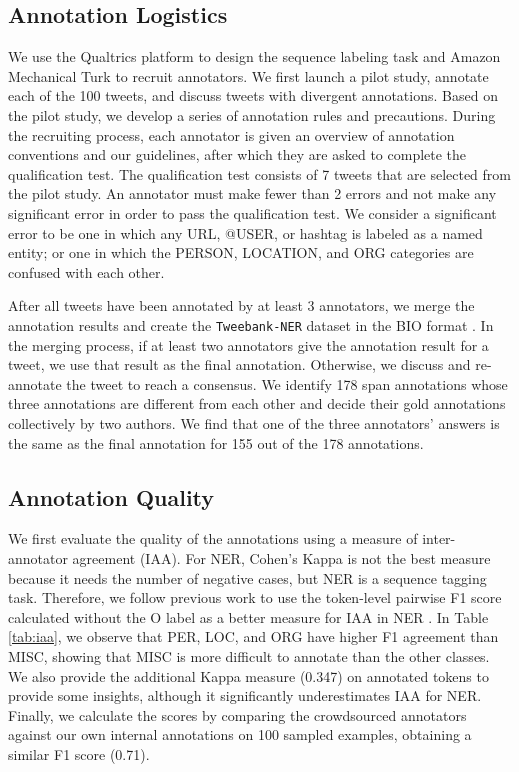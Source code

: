 \documentclass[10pt, a4paper]{article}
\begin{document}
\subsection{Annotation Logistics}
We use the Qualtrics platform to design the sequence labeling task and Amazon Mechanical Turk to recruit annotators. We first launch a pilot study, annotate each of the 100 tweets, and discuss tweets with divergent annotations. Based on the pilot study, we develop a series of annotation rules and precautions. During the recruiting process, each annotator is given an overview of annotation conventions and our guidelines, after which they are asked to complete the qualification test. The qualification test consists of 7 tweets that are selected from the pilot study. 
An annotator must make fewer than 2 errors and not make any significant error in order to pass the qualification test.  We consider a significant error to be one
in which any URL, @USER, or hashtag is labeled as a named entity;  or one in which the PERSON, LOCATION, and ORG categories are confused with each other.


After all tweets have been annotated by at least 3 annotators, we merge the annotation results and create the \texttt{Tweebank-NER} dataset in the BIO format \cite{ratinov2009design}. In the merging process, if at least two annotators give the annotation result for a tweet, we use that result as the final annotation. Otherwise, we discuss and re-annotate the tweet to reach a consensus. We identify 178 span annotations whose three annotations are different from each other and decide their gold annotations collectively by two authors.
We find that one of the three annotators' answers is the same as the final annotation for 155 out of the 178 annotations.






\subsection{Annotation Quality}
We first evaluate the quality of the annotations using a measure of inter-annotator agreement (IAA). For NER, Cohen's Kappa is not the best measure because it needs the number of negative cases, but NER is a sequence tagging task. Therefore, we follow previous work \cite{hripcsak2005agreement,grouin2011proposal,brandsen2020creating} to use the token-level pairwise F1 score calculated without the O label as a better measure for IAA in NER \cite{deleger2012building}. In Table \ref{tab:iaa}, we observe that PER, LOC, and ORG have higher F1 agreement than MISC, showing that MISC is more difficult to annotate than the other classes. We also provide the additional Kappa measure (0.347) on annotated tokens to provide some insights, although it significantly underestimates IAA for NER. Finally, we calculate the scores by comparing the crowdsourced annotators against our own internal annotations on 100 sampled examples, obtaining a similar F1 score (0.71). 
\end{document}
